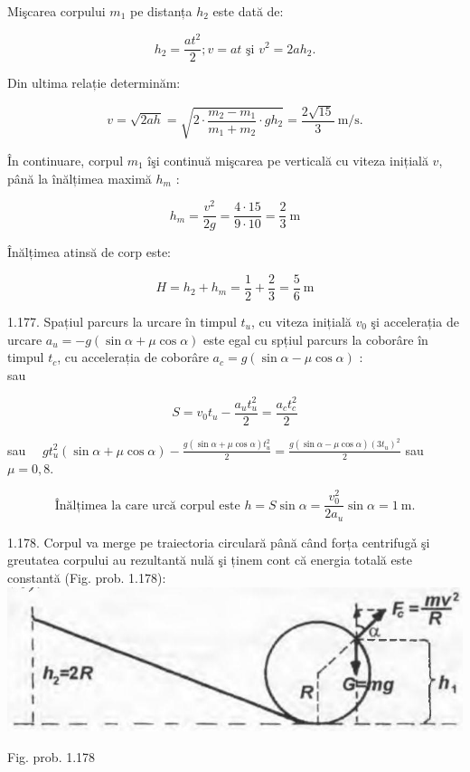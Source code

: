\documentclass[10pt]{article}
\begin{document}
Mişcarea corpului $m_{1}$ pe distanța $h_{2}$ este dată de:

$$
h_{2}=\frac{a t^{2}}{2} ; v=a t \text { şi } v^{2}=2 a h_{2} .
$$

Din ultima relație determinăm:

$$
v=\sqrt{2 a h}=\sqrt{2 \cdot \frac{m_{2}-m_{1}}{m_{1}+m_{2}} \cdot g h_{2}}=\frac{2 \sqrt{15}}{3} \mathrm{~m} / \mathrm{s} .
$$

În continuare, corpul $m_{1}$ îşi continuă mişcarea pe verticală cu viteza inițială $v$, până la înălțimea maximă $h_{m}$ :

$$
h_{m}=\frac{v^{2}}{2 g}=\frac{4 \cdot 15}{9 \cdot 10}=\frac{2}{3} \mathrm{~m}
$$

Înălțimea atinsă de corp este:

$$
H=h_{2}+h_{m}=\frac{1}{2}+\frac{2}{3}=\frac{5}{6} \mathrm{~m}
$$

1.177. Spațiul parcurs la urcare în timpul $t_{u}$, cu viteza inițială $v_{0}$ şi accelerația de urcare $a_{u}=-g(\sin \alpha+\mu \cos \alpha)$ este egal cu spțiul parcurs la coborâre în timpul $t_{c}$, cu accelerația de coborâre $a_{c}=g(\sin \alpha-\mu \cos \alpha)$ :\\
sau

$$
S=v_{0} t_{u}-\frac{a_{u} t_{u}^{2}}{2}=\frac{a_{c} t_{c}^{2}}{2}
$$

sau $\quad g t_{u}^{2}(\sin \alpha+\mu \cos \alpha)-\frac{g(\sin \alpha+\mu \cos \alpha) t_{u}^{2}}{2}=\frac{g(\sin \alpha-\mu \cos \alpha)\left(3 t_{u}\right)^{2}}{2}$ sau $\mu=0,8$.

$$
\text { Înălțimea la care urcă corpul este } h=S \sin \alpha=\frac{v_{0}^{2}}{2 a_{u}} \sin \alpha=1 \mathrm{~m} \text {. }
$$

1.178. Corpul va merge pe traiectoria circulară până când forța centrifugǎ şi greutatea corpului au rezultantă nulă şi ținem cont că energia totală este constantă (Fig. prob. 1.178):\\
\includegraphics[max width=\textwidth, center]{2025_07_01_5b3ff9fa0d508c8e9f17g-238}

Fig. prob. 1.178
\end{document}
